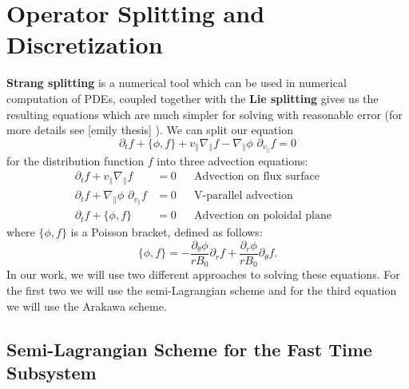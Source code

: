 
\section{Operator Splitting and Discretization}
\label{sec:splitting_discretization}

\textbf{Strang splitting} is a numerical tool which can be used in numerical computation of PDEs, coupled together with the \textbf{Lie splitting} %
gives us the resulting equations which are much simpler for solving with reasonable error (for more details see [emily thesis] %
). We can split our equation 
\begin{equation}
 \partial_t f + \{\phi, f \} + v_\parallel \nabla_\parallel f - \nabla_\parallel \phi\,\, \partial_{v_\parallel} f = 0
\end{equation}
for the distribution function $f$ into three advection equations:
\begin{subequations}
	\begin{align}
		\partial_t f + v_\parallel \nabla_\parallel f & = 0 && \text{Advection on flux surface} & \\
		\partial_t f + \nabla_\parallel \phi\,\, \partial_{v_{\parallel}} f & = 0 && \text{V-parallel advection} & \\
		\partial_t f + \{\phi, f\} & = 0 && \text{Advection on poloidal plane} &
	\end{align}
\end{subequations}
where $\{\phi,f\}$ is a Poisson bracket, defined as follows:
\begin{equation}
 \{\phi,f\}=-\frac{\partial_\theta\phi}{rB_0}\partial_r f + \frac{\partial_r\phi}{rB_0}\partial_\theta f.
\end{equation}
In our work, we will use two different approaches to solving these equations. For the first two we will use the semi-Lagrangian scheme and for the third equation we will use the Arakawa scheme.







\subsection{Semi-Lagrangian Scheme for the Fast Time Subsystem}

